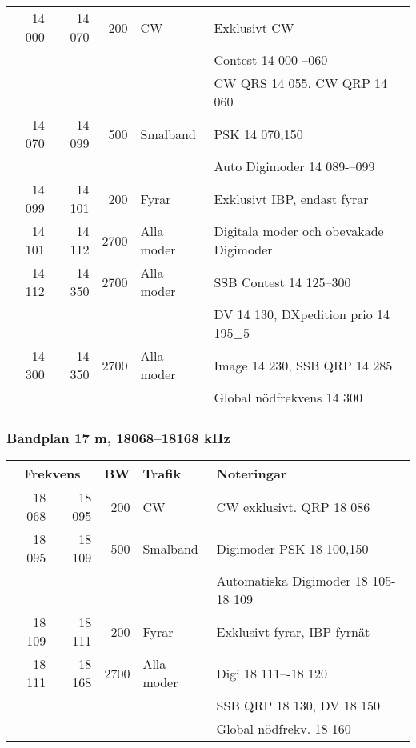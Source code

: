 \begin{landscape}
\begin{tabular}{rrrll}
14 000 & 14 070 & 200  & CW         & Exklusivt CW                            \\
       &        &      &            & Contest 14 000-–060                     \\
       &        &      &            & CW QRS 14 055, CW QRP 14 060            \\ \hline
14 070 & 14 099 & 500  & Smalband   & PSK 14 070,150                          \\
       &        &      &            & Auto Digimoder 14 089-–099              \\ \hline
14 099 & 14 101 & 200  & Fyrar      & Exklusivt IBP, endast fyrar             \\ \hline
14 101 & 14 112 & 2700 & Alla moder & Digitala moder och obevakade Digimoder  \\ \hline
14 112 & 14 350 & 2700 & Alla moder & SSB Contest 14 125--300                 \\
       &        &      &            & DV 14 130, DXpedition prio 14 195$\pm$5 \\ \hline
14 300 & 14 350 & 2700 & Alla moder & Image 14 230, SSB QRP 14 285            \\
       &        &      &            & Global nödfrekvens 14 300               \\ \hline
\end{tabular}




\subsubsection{Bandplan 17 m, 18068--18168 kHz}
\begin{tabular}{rrrll}
\multicolumn{2}{c}{\textbf{Frekvens}} & \textbf{BW} & \textbf{Trafik} & \textbf{Noteringar} \\ \hline

18 068 & 18 095 & 200  & CW         & CW exklusivt. QRP 18 086             \\ \hline
18 095 & 18 109 & 500  & Smalband   & Digimoder PSK 18 100,150             \\
       &        &      &            & Automatiska Digimoder 18 105-–18 109 \\ \hline
18 109 & 18 111 & 200  & Fyrar      & Exklusivt fyrar, IBP fyrnät          \\ \hline
18 111 & 18 168 & 2700 & Alla moder & Digi 18 111–-18 120                  \\
       &        &      &            & SSB QRP 18 130, DV 18 150            \\
       &        &      &            & Global nödfrekv. 18 160\\ \hline
\end{tabular}



\end{landscape}

